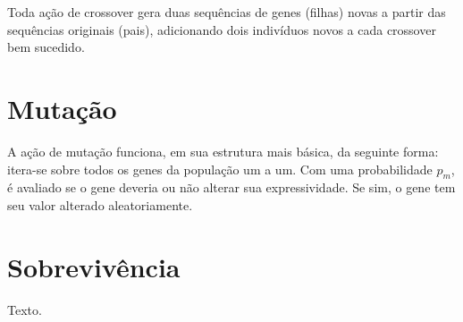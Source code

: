 Toda ação de crossover gera duas sequências de genes (filhas) novas a partir das sequências originais (pais), adicionando dois indivíduos novos a cada crossover bem sucedido.

\section{Mutação}

A ação de mutação funciona, em sua estrutura mais básica, da seguinte forma: itera-se sobre todos os genes da população um a um. Com uma probabilidade $p_m$, é avaliado se o gene deveria ou não alterar sua expressividade. Se sim, o gene tem seu valor alterado aleatoriamente.

\section{Sobrevivência}

Texto.

